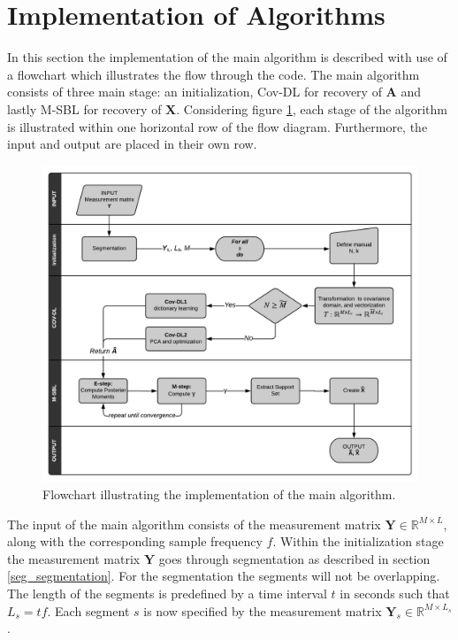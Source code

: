 \section{Implementation of Algorithms}\label{sec:implementation_flow}
In this section the implementation of the main algorithm is described with use of a flowchart which illustrates the flow through the code.
The main algorithm consists of three main stage: an initialization, Cov-DL for recovery of $\mathbf{A}$ and lastly M-SBL for recovery of $\mathbf{X}$. 
Considering figure \ref{fig:flow}, each stage of the algorithm is illustrated within one horizontal row of the flow diagram.
Furthermore, the input and output are placed in their own row.    
\begin{figure}[H]
\centering
\includegraphics[scale=0.7]{figures/ch_6/baseline_flowchart.png}
\caption{Flowchart illustrating the implementation of the main algorithm.}
\label{fig:flow}
\end{figure}
\noindent
The input of the main algorithm consists of the measurement matrix $\mathbf{Y} \in \mathbb{R}^{M \times L}$, along with the corresponding sample frequency $f$. 
Within the initialization stage the measurement matrix $\mathbf{Y}$ goes through segmentation as described in section \ref{seg_segmentation}. 
For the segmentation the segments will not be overlapping.
The length of the segments is predefined by a time interval $t$ in seconds such that $L_{s} = tf$. 
Each segment $s$ is now specified by the measurement matrix $\mathbf{Y}_s \in \mathbb{R}^{M \times L_{s}}$.
